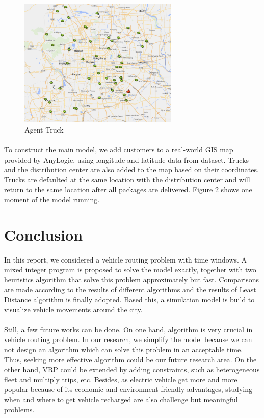 \documentclass[12pt]{article}
\numberwithin{equation}{section}
\begin{document}
	\begin{figure}[htbp]
	\centering \includegraphics[width=3in]{run}
	\caption{Agent Truck}
	\end{figure}
	
	\paragraph{}To construct the main model, we add customers to a real-world GIS map provided by AnyLogic, using longitude and latitude data from dataset. Trucks and the distribution center are also added to the map based on their coordinates. Trucks are defaulted at the same location with the distribution center and will return to the same location after all packages are delivered. Figure 2 shows one moment of the model running.
	


\section{Conclusion}

	\paragraph{}In this report, we considered a vehicle routing problem with time windows. A mixed integer program is proposed to solve the model exactly, together with two heuristics algorithm that solve this problem approximately but fast. Comparisons are made according to the results of different algorithms and the results of Least Distance algorithm is finally adopted. Based this, a simulation model is build to visualize vehicle movements around the city.
	
	\paragraph{}Still, a few future works can be done. On one hand, algorithm is very crucial in vehicle routing problem. In our research, we simplify the model because we can not design an algorithm which can solve this problem in an acceptable time. Thus, seeking more effective algorithm could be our future research area. On the other hand, VRP could be extended by adding constraints, such as heterogeneous fleet and multiply trips, etc. Besides,  as electric vehicle get more and more popular because of its economic and environment-friendly advantages, studying when and where to get vehicle recharged are also challenge but meaningful problems.
	
\end{document}

